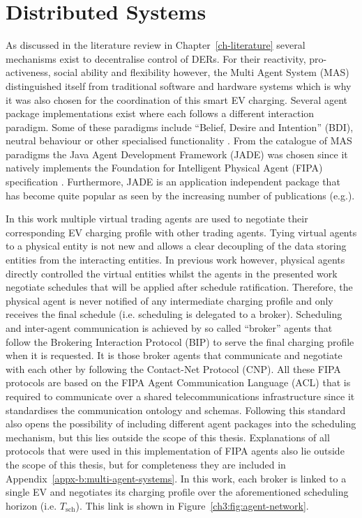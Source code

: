 \section{Distributed Systems}
\label{ch3:sec:distributed-systems}

As discussed in the literature review in Chapter~\ref{ch-literature} several mechanisms exist to decentralise control of DERs.
For their reactivity, pro-activeness, social ability and flexibility however, the Multi Agent System (MAS) distinguished itself from traditional software and hardware systems which is why it was also chosen for the coordination of this smart EV charging.
Several agent package implementations exist where each follows a different interaction paradigm.
Some of these paradigms include ``Belief, Desire and Intention'' (BDI), neutral behaviour or other specialised functionality \cite{Luck2004}.
From the catalogue of MAS paradigms the Java Agent Development Framework (JADE) was chosen since it natively implements the Foundation for Intelligent Physical Agent (FIPA) specification \cite{JADE-website, FIPA-agent-specs}.
Furthermore, JADE is an application independent package that has become quite popular as seen by the increasing number of publications (e.g.\cite{Karfopoulos2013, Eddy2011, Kuo2013, Mocci2014, Li2017}).

In this work multiple virtual trading agents are used to negotiate their corresponding EV charging profile with other trading agents.
Tying virtual agents to a physical entity is not new \cite{Dimeas2005, Nguyen2011, Nagata2011, Nagata2012} and allows a clear decoupling of the data storing entities from the interacting entities.
In previous work however, physical agents directly controlled the virtual entities whilst the agents in the presented work negotiate schedules that will be applied after schedule ratification.
Therefore, the physical agent is never notified of any intermediate charging profile and only receives the final schedule (i.e. scheduling is delegated to a broker).
Scheduling and inter-agent communication is achieved by so called ``broker'' agents that follow the Brokering Interaction Protocol (BIP) to serve the final charging profile when it is requested.
It is those broker agents that communicate and negotiate with each other by following the Contact-Net Protocol (CNP).
All these FIPA protocols are based on the FIPA Agent Communication Language (ACL) that is required to communicate over a shared telecommunications infrastructure since it standardises the communication ontology and schemas.
Following this standard also opens the possibility of including different agent packages into the scheduling mechanism, but this lies outside the scope of this thesis.
Explanations of all protocols that were used in this implementation of FIPA agents also lie outside the scope of this thesis, but for completeness they are included in Appendix~\ref{appx-b:multi-agent-systems}.
In this work, each broker is linked to a single EV and negotiates its charging profile over the aforementioned scheduling horizon (i.e. $T_\text{sch}$).
This link is shown in Figure~\ref{ch3:fig:agent-network}.

